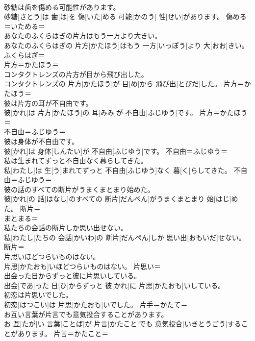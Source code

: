 \documentclass[8pt]{extreport}
\begin{document}
\begin{CJK}{UTF8}{min}
\\	砂糖は歯を傷める可能性があります。	
\\	砂糖[さとう]は 歯[は]を 傷[いた]める 可能[かのう] 性[せい]があります。	傷める＝いためる＝ 
\\	あなたのふくらはぎの片方はもう一方より大きい。	
\\	あなたのふくらはぎの 片方[かたほう]はもう 一方[いっぽう]より 大[おお]きい。	ふくらはぎ＝ 
\\	片方＝かたほう＝ 
\\	コンタクトレンズの片方が目から飛び出した。	
\\	コンタクトレンズの 片方[かたほう]が 目[め]から 飛び出[とびだ]した。	片方＝かたほう＝ 
\\	彼は片方の耳が不自由です。	
\\	彼[かれ]は 片方[かたほう]の 耳[みみ]が 不自由[ふじゆう]です。	片方＝かたほう＝ 
\\	不自由＝ふじゆう＝ 
\\	彼は身体が不自由です。	
\\	彼[かれ]は 身体[しんたい]が 不自由[ふじゆう]です。	不自由＝ふじゆう＝ 
\\	私は生まれてずっと不自由なく暮らしてきた。	
\\	私[わたし]は 生[う]まれてずっと 不自由[ふじゆう]なく 暮[く]らしてきた。	不自由＝ふじゆう＝ 
\\	彼の話のすべての断片がうまくまとまり始めた。	
\\	彼[かれ]の 話[はなし]のすべての 断片[だんぺん]がうまくまとまり 始[はじ]めた。	断片＝ 
\\	まとまる＝ 
\\	私たちの会話の断片しか思い出せない。	
\\	私[わたし]たちの 会話[かいわ]の 断片[だんぺん]しか 思い出[おもいだ]せない。	断片＝ 
\\	片思いほどつらいものはない。	
\\	片思[かたおも]いほどつらいものはない。	片思い＝ 
\\	出会った日からずっと彼に片思いしている。	
\\	出会[であ]った 日[ひ]からずっと 彼[かれ]に 片思[かたおも]いしている。	
\\	初恋は片思いでした。	
\\	初恋[はつこい]は 片思[かたおも]いでした。	片手＝かたて＝ 
\\	お互い言葉が片言でも意気投合することがあります。	
\\	お 互[たが]い 言葉[ことば]が 片言[かたこと]でも 意気投合[いきとうごう]することがあります。	片言＝かたこと＝ 

\end{CJK}
\end{document}
